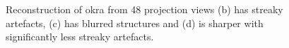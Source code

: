 \documentclass[journal]{IEEEtran}
\begin{document}
\begin{figure}[!h]
{}
\caption{Reconstruction of okra from 48 projection views
   (b) has streaky artefacts, (c) has blurred structures and (d) is sharper with significantly less streaky artefacts.}
\label{fig:okra_2D_results}
\end{figure}
\end{document}

